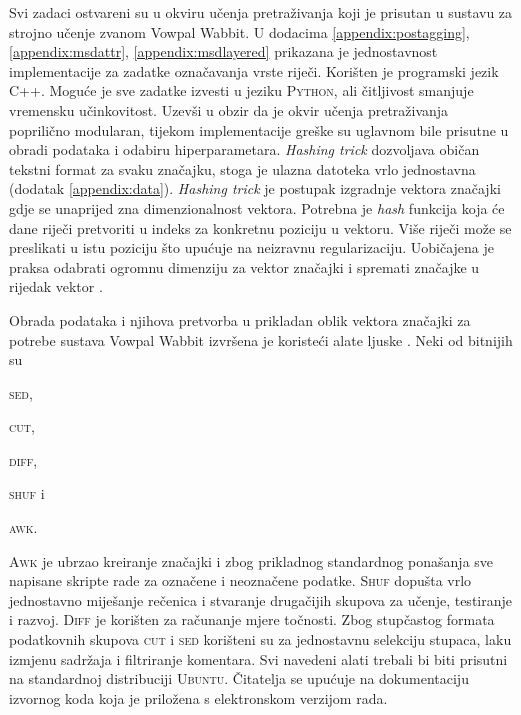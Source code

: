 Svi zadaci ostvareni su u okviru učenja pretraživanja koji je prisutan u
sustavu za strojno učenje zvanom Vowpal Wabbit. U dodacima
\ref{appendix:postagging}, \ref{appendix:msdattr}, \ref{appendix:msdlayered}
prikazana je jednostavnost implementacije za zadatke označavanja vrste riječi.
Korišten je programski jezik \textsc{C++}. Moguće je sve zadatke izvesti u
jeziku \textsc{Python}, ali čitljivost smanjuje vremensku
učinkovitost. Uzevši u obzir da je okvir učenja pretraživanja poprilično
modularan, tijekom implementacije greške su uglavnom bile prisutne u
obradi podataka i odabiru hiperparametara. \textit{Hashing trick} dozvoljava
običan tekstni format za svaku značajku, stoga je ulazna datoteka vrlo
jednostavna (dodatak \ref{appendix:data}). \textit{Hashing trick} je postupak
izgradnje vektora značajki gdje se unaprijed zna dimenzionalnost vektora.
Potrebna je \textit{hash} funkcija koja će dane riječi pretvoriti u indeks za
konkretnu poziciju u vektoru. Više riječi može se preslikati u istu poziciju što
upućuje na neizravnu regularizaciju. Uobičajena je praksa odabrati ogromnu
dimenziju za vektor značajki i spremati značajke u rijedak vektor .

Obrada podataka i njihova pretvorba u prikladan oblik vektora značajki za
potrebe sustava Vowpal Wabbit izvršena je koristeći alate ljuske .
Neki od  bitnijih su
\begin{inlinelist}
  \item \textsc{sed},
  \item \textsc{cut},
  \item \textsc{diff},
  \item \textsc{shuf} i
  \item \textsc{awk}.
\end{inlinelist}
\textsc{Awk} je ubrzao kreiranje značajki i zbog prikladnog standardnog
ponašanja sve napisane skripte rade za označene i neoznačene podatke.
\textsc{Shuf} dopušta vrlo jednostavno miješanje rečenica i stvaranje drugačijih
skupova za učenje, testiranje i razvoj. \textsc{Diff} je korišten za računanje
mjere točnosti. Zbog stupčastog formata podatkovnih skupova \textsc{cut} i
\textsc{sed} korišteni su za jednostavnu selekciju stupaca, laku izmjenu
sadržaja i filtriranje komentara. Svi navedeni alati trebali bi biti prisutni na
standardnoj distribuciji \textsc{Ubuntu}. Čitatelja se upućuje na dokumentaciju
izvornog koda koja je priložena s elektronskom verzijom rada.

